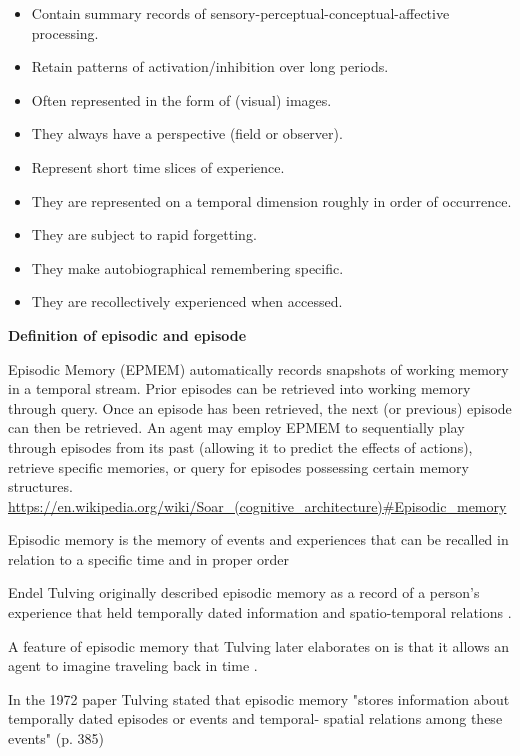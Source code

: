\documentclass{book}
\providecommand{\ProjectDeepHeading}[2]{%
    \par\medskip\noindent\textbf{#2}\par\smallskip
}
\begin{document}
    \begin{itemize}
        \item Contain summary records of sensory-perceptual-conceptual-affective processing.
        \item Retain patterns of activation/inhibition over long periods.
        \item Often represented in the form of (visual) images.
        \item They always have a perspective (field or observer).
        \item Represent short time slices of experience.
        \item They are represented on a temporal dimension roughly in order of occurrence.
        \item They are subject to rapid forgetting.
        \item They make autobiographical remembering specific.
        \item They are recollectively experienced when accessed.
    \end{itemize}
    
    \ProjectDeepHeading{15}{Definition of episodic and episode}
    Episodic Memory (EPMEM) automatically records snapshots of working memory in a temporal stream. Prior episodes can be retrieved into working memory through query. Once an episode has been retrieved, the next (or previous) episode can then be retrieved. An agent may employ EPMEM to sequentially play through episodes from its past (allowing it to predict the effects of actions), retrieve specific memories, or query for episodes possessing certain memory structures. \url{https://en.wikipedia.org/wiki/Soar_(cognitive_architecture)\#Episodic_memory}
    
    Episodic memory is the memory of events and experiences that can be recalled in relation to a specific time and in proper order \cite{tulving-2002-episodic-memory-from-mind-to-brain}
    
    Endel Tulving originally described episodic memory as a record of a person's experience that held temporally dated information and spatio-temporal relations \cite{tulving-1983-elements-of-episodic-memory}.
    
    A feature of episodic memory that Tulving later elaborates on is that it allows an agent to imagine traveling back in time \cite{tulving-2002-episodic-memory-from-mind-to-brain}.
    
    In the 1972 paper Tulving stated that episodic memory
    "stores information about temporally dated episodes or events and temporal-
    spatial relations among these events" (p. 385) \cite{tulving-1972-episodic-and-semantic-memory}
    
\end{document}
